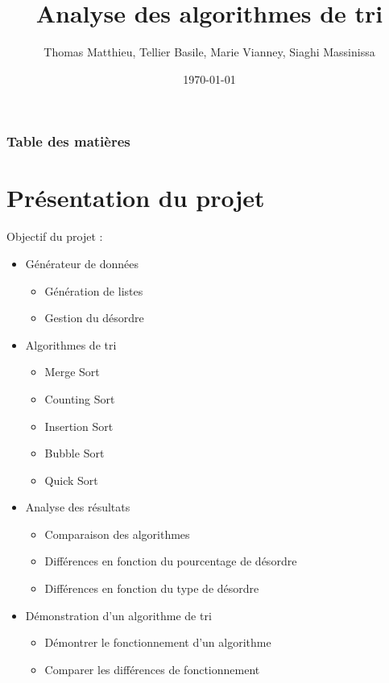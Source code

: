 \documentclass[10pt]{beamer}
\author{Thomas Matthieu, Tellier Basile, Marie Vianney, Siaghi Massinissa}
\date{\today}
\title{Analyse des algorithmes de tri}
\begin{document}
\begin{frame}
\maketitle
\end{frame}

\begin{frame}
\frametitle{Table des matières}
\tableofcontents
\end{frame}

\section{Présentation du projet}
\begin{frame}
Objectif du projet :
  \begin{itemize}
      \item <1-> Générateur de données 
      \begin{itemize}
        \item Génération de listes
        \item Gestion du désordre
      \end{itemize}   
      \item <2-> Algorithmes de tri 
      \begin{itemize}
        \item Merge Sort
        \item Counting Sort
        \item Insertion Sort
        \item Bubble Sort 
        \item Quick Sort 
      \end{itemize}
      \item <3-> Analyse des résultats
        \begin{itemize}
          \item Comparaison des algorithmes 
          \item Différences en fonction du pourcentage de désordre 
          \item Différences en fonction du type de désordre 
        \end{itemize}
      \item <4-> Démonstration d'un algorithme de tri
        \begin{itemize}
          \item Démontrer le fonctionnement d'un algorithme 
          \item Comparer les différences de fonctionnement
        \end{itemize}
  \end{itemize}
\end{frame}
\end{document}
